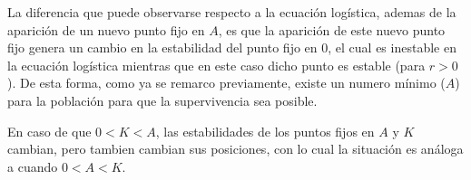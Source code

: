 La diferencia que puede observarse respecto a la ecuación logística, ademas de la aparición de un nuevo punto fijo en $A$, es que la aparición de este nuevo punto fijo genera un cambio en la estabilidad del punto fijo en $0$, el cual es inestable en la ecuación logística mientras que en este caso dicho punto es estable (para $r>0$). De esta forma, como ya se remarco previamente, existe un numero mínimo ($A$) para la población para que la supervivencia sea posible.

En caso de que $0<K<A$, las estabilidades de los puntos fijos en $A$ y $K$ cambian, pero tambien cambian sus posiciones, con lo cual la situación es análoga a cuando $0<A<K$.
